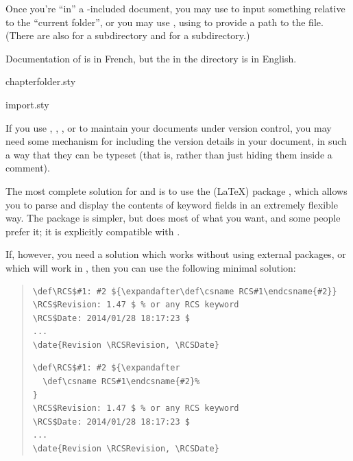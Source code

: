 Once you're ``in'' a -included document, you
may use  to input something relative to the ``current
folder'', or you may use , using  to
provide a path to the file.  (There are also
 for a  subdirectory and
 for a  subdirectory.)

Documentation of  is in French, but the
 in the directory is in English.
\begin{ctanrefs}
\item[chapterfolder.sty]
\item[import.sty]
\end{ctanrefs}


If you use , , ,
 or  to maintain
your \AllTeX{} documents under version control, you may need some
mechanism for including the version details in your document, in such
a way that they can be typeset (that is, rather than just hiding them
inside a comment).

The most complete solution for  and  is to use the
(\LaTeX{}) package , which allows you to parse and
display the contents of  keyword fields in an extremely
flexible way.  The package  is simpler, but does most
of what you want, and some people prefer it; it is explicitly
compatible with .

If, however, you need a solution which works without using external
packages, or which will work in \plaintex{}, then you can use the
following minimal solution:
\begin{quote}
\begin{wideversion}
\begin{verbatim}
\def\RCS$#1: #2 ${\expandafter\def\csname RCS#1\endcsname{#2}}
\RCS$Revision: 1.47 $ % or any RCS keyword
\RCS$Date: 2014/01/28 18:17:23 $
...
\date{Revision \RCSRevision, \RCSDate}
\end{verbatim}
\end{wideversion}
\begin{narrowversion}
\begin{verbatim}
\def\RCS$#1: #2 ${\expandafter
  \def\csname RCS#1\endcsname{#2}%
}
\RCS$Revision: 1.47 $ % or any RCS keyword
\RCS$Date: 2014/01/28 18:17:23 $
...
\date{Revision \RCSRevision, \RCSDate}
\end{verbatim}
\end{narrowversion}
\end{quote}

